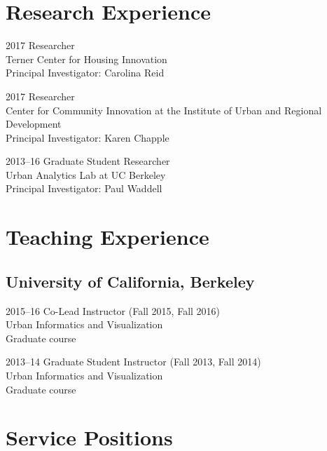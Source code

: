 \documentclass{academiccv}
\begin{document}
\section*{Research Experience}

\begin{tablist}
\item[2017] 	\tab Researcher \\
			   		 Terner Center for Housing Innovation \\
					 Principal Investigator: Carolina Reid
\item[2017] 	\tab Researcher \\
	                 Center for Community Innovation at the Institute of Urban and Regional Development \\
	                 Principal Investigator: Karen Chapple
\item[2013--16] \tab Graduate Student Researcher \\
                     Urban Analytics Lab at UC Berkeley \\
                     Principal Investigator: Paul Waddell
\end{tablist}



\section*{Teaching Experience}

\subsection*{University of California, Berkeley}

\begin{tablist}
\item[2015--16] \tab Co-Lead Instructor (Fall 2015, Fall 2016) \\
                     Urban Informatics and Visualization \\
                     Graduate course
\item[2013--14] \tab Graduate Student Instructor (Fall 2013, Fall 2014) \\
                     Urban Informatics and Visualization \\
                     Graduate course
\end{tablist}



\section*{Service Positions}
\end{document}

